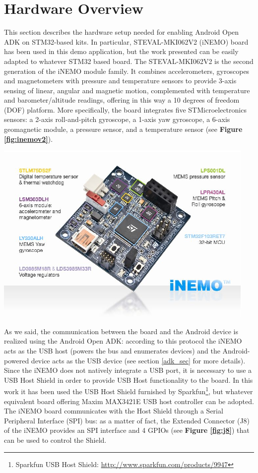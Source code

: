 \section{Hardware Overview}
\label{hw_sec}

This section describes the hardware setup needed for enabling Android Open ADK on STM32-based kits. In particular, STEVAL-MKI062V2 (iNEMO) \cite{STM_inemo} board has been used in this demo application, but the work presented can be easily adapted to whatever STM32 based board. The STEVAL-MKI062V2 is the second generation of the iNEMO module family. It combines accelerometers, gyroscopes and magnetometers with pressure and temperature sensors to provide 3-axis sensing of linear, angular and magnetic motion, complemented with temperature and barometer/altitude readings, offering in this way a 10 degrees of freedom (DOF) platform. More specifically, the board integrates five STMicroelectronics sensors: a 2-axis roll-and-pitch gyroscope, a 1-axis yaw gyroscope, a 6-axis geomagnetic module, a pressure sensor, and a temperature sensor (see {\bf Figure \ref{fig:inemov2}}).

\begin{center}
	\includegraphics[width=0.95\linewidth]{pics/inemov2.eps}
	\label{fig:inemov2}
\end{center}

As we said, the communication between the board and the Android device is realized using the Android Open ADK: according to this protocol the iNEMO acts as the USB host (powers the bus and enumerates devices) and the Android-powered device acts as the USB device (see section \ref{adk_sec} for more details). Since the iNEMO does not natively integrate a USB port, it is necessary to use a USB Host Shield in order to provide USB Host functionality to the board. In this work it has been used the USB Host Shield furnished by Sparkfun\footnote{Sparkfun USB Host Shield: \url{http://www.sparkfun.com/products/9947}}, but whatever equivalent board offering Maxim MAX3421E\cite{max3421e} USB host controller can be adopted. The iNEMO board communicates with the Host Shield through a Serial Peripheral Interface (SPI) bus: as a matter of fact, the Extended Connector (J8) of the iNEMO provides an SPI interface and 4 GPIOs (see {\bf Figure \ref{fig:j8}}) that can be used to control the Shield.

